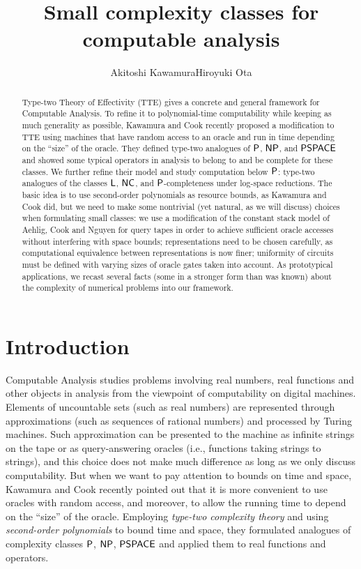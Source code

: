 \documentclass[envcountsect,envcountsame,orivec,oribibl]{llncs}
\title{Small complexity classes for computable analysis}
\author{Akitoshi Kawamura\qquad\qquad Hiroyuki Ota}
\institute{University of Tokyo}
\begin{document}
\maketitle

\begin{abstract}
Type-two Theory of Effectivity (TTE) gives a concrete and general framework for 
Computable Analysis. 
To refine it to polynomial-time computability 
while keeping as much generality as possible, 
Kawamura and Cook recently proposed a modification to TTE using 
machines that have random access to an oracle and 
run in time depending on the ``size'' of the oracle. 
They defined type-two analogues of 
$\mathsf{P}$, $\mathsf{NP}$, and $\mathsf{PSPACE}$ 
and showed some typical operators in analysis
to belong to and be complete for these classes. 
We further refine their model and study computation below $\mathsf{P}$: 
type-two analogues of 
the classes $\mathsf{L}$, 
$\mathsf{NC}$, 
and $\mathsf{P}$-completeness under log-space reductions.
The basic idea is 
to use second-order polynomials as resource bounds, 
as Kawamura and Cook did, 
but we need to make some nontrivial (yet natural, as we will discuss) choices
when formulating small classes: 
we use a modification of the constant stack model 
of Aehlig, Cook and Nguyen for query tapes 
in order to achieve 
sufficient oracle accesses without interfering with space bounds; 
representations need to be chosen carefully, as 
computational equivalence between representations is now finer; 
uniformity of circuits must be defined 
with varying sizes of oracle gates taken into account. 
As prototypical applications, 
we recast several facts (some in a stronger form than was known) 
about the complexity of numerical problems 
into our framework. 
\end{abstract}

\section{Introduction}

Computable Analysis 
\cite{ko1991complexity,weihrauch00:_comput_analy}
studies problems 
involving real numbers, real functions and other objects in analysis
from the viewpoint of computability on digital machines. 
Elements of uncountable sets (such as real numbers) are
represented through approximations (such as sequences of rational numbers)
and processed by Turing machines. 
Such approximation can be 
presented to the machine 
as infinite strings on the tape 
or as query-answering oracles (i.e., functions taking strings to strings), 
and this choice does not make much difference 
as long as we only discuss computability. 
But when we want to pay attention to bounds on time and space, 
Kawamura and Cook \cite{kawamura2012complexity} recently pointed out that 
it is more convenient to use oracles with random access, 
and moreover, to allow the running time 
to depend on the ``size'' of the oracle. 
Employing \emph{type-two complexity theory} and 
using \emph{second-order polynomials} to bound time and space, 
they formulated analogues of complexity classes 
$\mathsf{P}$, $\mathsf{NP}$, $\mathsf{PSPACE}$ and 
applied them to real functions and operators. 
\end{document}
